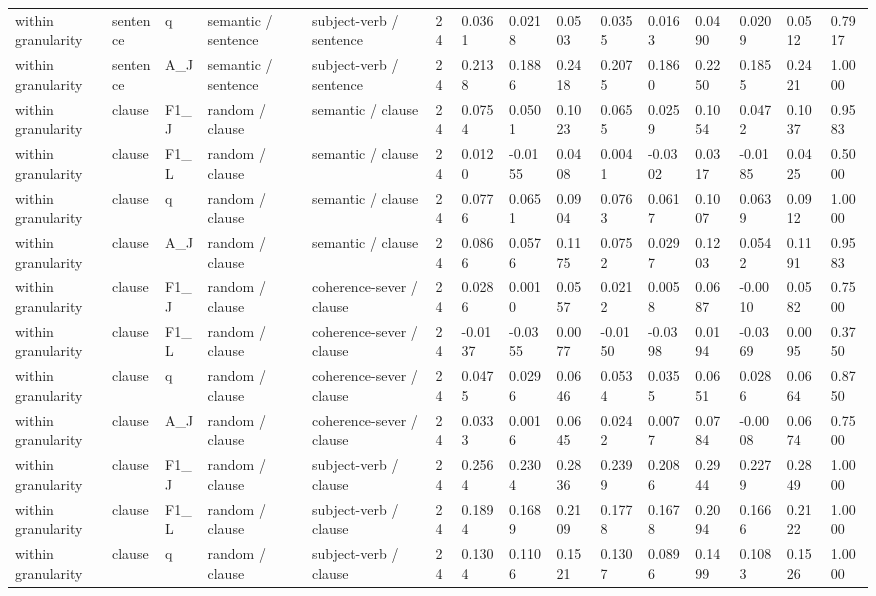 \begin{table}[t]
{\begin{tabular}{lllllllllllllll}
within granularity & sentence & q & semantic / sentence & subject-verb / sentence & 24 & 0.0361 & 0.0218 & 0.0503 & 0.0355 & 0.0163 & 0.0490 & 0.0209 & 0.0512 & 0.7917 \\
within granularity & sentence & A\_J & semantic / sentence & subject-verb / sentence & 24 & 0.2138 & 0.1886 & 0.2418 & 0.2075 & 0.1860 & 0.2250 & 0.1855 & 0.2421 & 1.0000 \\
within granularity & clause & F1\_J & random / clause & semantic / clause & 24 & 0.0754 & 0.0501 & 0.1023 & 0.0655 & 0.0259 & 0.1054 & 0.0472 & 0.1037 & 0.9583 \\
within granularity & clause & F1\_L & random / clause & semantic / clause & 24 & 0.0120 & -0.0155 & 0.0408 & 0.0041 & -0.0302 & 0.0317 & -0.0185 & 0.0425 & 0.5000 \\
within granularity & clause & q & random / clause & semantic / clause & 24 & 0.0776 & 0.0651 & 0.0904 & 0.0763 & 0.0617 & 0.1007 & 0.0639 & 0.0912 & 1.0000 \\
within granularity & clause & A\_J & random / clause & semantic / clause & 24 & 0.0866 & 0.0576 & 0.1175 & 0.0752 & 0.0297 & 0.1203 & 0.0542 & 0.1191 & 0.9583 \\
within granularity & clause & F1\_J & random / clause & coherence-sever / clause & 24 & 0.0286 & 0.0010 & 0.0557 & 0.0212 & 0.0058 & 0.0687 & -0.0010 & 0.0582 & 0.7500 \\
within granularity & clause & F1\_L & random / clause & coherence-sever / clause & 24 & -0.0137 & -0.0355 & 0.0077 & -0.0150 & -0.0398 & 0.0194 & -0.0369 & 0.0095 & 0.3750 \\
within granularity & clause & q & random / clause & coherence-sever / clause & 24 & 0.0475 & 0.0296 & 0.0646 & 0.0534 & 0.0355 & 0.0651 & 0.0286 & 0.0664 & 0.8750 \\
within granularity & clause & A\_J & random / clause & coherence-sever / clause & 24 & 0.0333 & 0.0016 & 0.0645 & 0.0242 & 0.0077 & 0.0784 & -0.0008 & 0.0674 & 0.7500 \\
within granularity & clause & F1\_J & random / clause & subject-verb / clause & 24 & 0.2564 & 0.2304 & 0.2836 & 0.2399 & 0.2086 & 0.2944 & 0.2279 & 0.2849 & 1.0000 \\
within granularity & clause & F1\_L & random / clause & subject-verb / clause & 24 & 0.1894 & 0.1689 & 0.2109 & 0.1778 & 0.1678 & 0.2094 & 0.1666 & 0.2122 & 1.0000 \\
within granularity & clause & q & random / clause & subject-verb / clause & 24 & 0.1304 & 0.1106 & 0.1521 & 0.1307 & 0.0896 & 0.1499 & 0.1083 & 0.1526 & 1.0000 \\

\end{tabular}}
\end{table}

